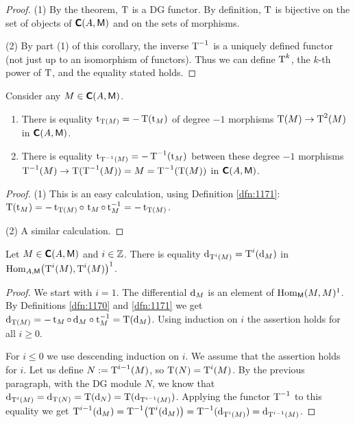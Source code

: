 \begin{proof}
(1) By the theorem, $\operatorname{T}$ is a DG functor. By definition, $\operatorname{T}$
is bijective on the set of objects of $\boldsymbol{\mathsf{C}}(A, \operatorname{\mathsf{M}})$ and on the sets of 
morphisms. 

\medskip \noindent 
(2) By part (1) of this corollary, the inverse $\operatorname{T}^{-1}$ is a uniquely 
defined functor (not just up to an isomorphism of functors). 
Thus we can define $\operatorname{T}^k$, the $k$-th power of $\operatorname{T}$, and the equality 
stated holds. 
\end{proof}

\begin{prop} \label{prop:1935}
Consider any $M \in \boldsymbol{\mathsf{C}}(A, \operatorname{\mathsf{M}})$.
\begin{enumerate}
\item There is equality 
$\operatorname{t}_{\operatorname{T}(M)} = - \operatorname{T}(\operatorname{t}_M)$
of degree $-1$ morphisms $\operatorname{T}(M) \to \operatorname{T}^2(M)$
in  $\boldsymbol{\mathsf{C}}(A, \operatorname{\mathsf{M}})$.

\item There is equality 
$\operatorname{t}_{\operatorname{T}^{-1}(M)} = - \operatorname{T}^{-1}(\operatorname{t}_M)$
between these degree $-1$ morphisms  
$\operatorname{T}^{-1}(M) \to \operatorname{T}(\operatorname{T}^{-1}(M)) = M = \operatorname{T}^{-1}(\operatorname{T}(M))$
in  $\boldsymbol{\mathsf{C}}(A, \operatorname{\mathsf{M}})$.
\end{enumerate}
\end{prop}

\begin{proof}
(1) This is an easy calculation, using Definition \ref{dfn:1171}:
$\opn{T}(\opn{t}_M) = \lb 
- \opn{t}_{\opn{T}(M)} \circ \, \opn{t}_{M} \circ \opn{t}_{M}^{-1} = 
- \opn{t}_{\opn{T}(M)}$.

\medskip \noindent 
(2) A similar calculation. 
\end{proof}

\begin{prop} \label{prop:4155}
Let $M \in \boldsymbol{\mathsf{C}}(A, \operatorname{\mathsf{M}})$ and $i \in \mathbb{Z}$. There is equality 
$\mathrm{d}_{\operatorname{T}^i(M)} = \operatorname{T}^i(\mathrm{d}_M)$
in 
$\operatorname{Hom}_{A, \operatorname{\mathsf{M}}} \bigl(\operatorname{T}^i(M) , \operatorname{T}^i(M) \bigr)^{1}$. 
\end{prop}

\begin{proof}
We start with $i = 1$. The differential $\mathrm{d}_M$ is an element of 
$\operatorname{Hom}_{\operatorname{\mathsf{M}}}(M , M)^1$. 
By Definitions \ref{dfn:1170} and \ref{dfn:1171} we get 
$\mathrm{d}_{\operatorname{T}(M)} = - \operatorname{t}_M \circ \, \mathrm{d}_M \circ \operatorname{t}_M^{-1} 
=  \operatorname{T}(\mathrm{d}_{M})$.
Using induction on $i$ the assertion holds for all $i \geq 0$. 

For $i \leq 0$ we use descending induction on $i$. 
We assume that the assertion holds for $i$. 
Let us define $N := \operatorname{T}^{i - 1}(M)$, so 
$\operatorname{T}^{}(N) = \operatorname{T}^{i}(M)$. 
By the previous paragraph, with the DG module $N$, we know that 
$\mathrm{d}_{\operatorname{T}^{i}(M)} = \mathrm{d}_{\operatorname{T}^{}(N)} = \operatorname{T}(\mathrm{d}_{N}) = 
\operatorname{T}(\mathrm{d}_{\operatorname{T}^{i - 1}(M)})$.
Applying the functor $\operatorname{T}^{-1}$ to this equality we get 
$\operatorname{T}^{i - 1}(\mathrm{d}_{M}) = 
\operatorname{T}^{-1} \bigl( \operatorname{T}^{i}(\mathrm{d}_M) \bigr) = 
\operatorname{T}^{-1}(\mathrm{d}_{\operatorname{T}^{i}(M)})
= \mathrm{d}_{\operatorname{T}^{i - 1}(M)}$. %
\end{proof}

